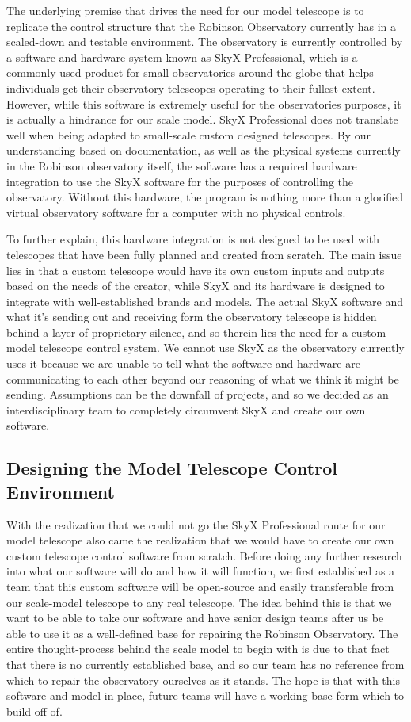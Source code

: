 \documentclass[12pt]{article}
\begin{document}
The underlying premise that drives the need for our model telescope is to replicate the control structure that the Robinson Observatory currently has in a scaled-down and testable environment. The observatory is currently controlled by a software and hardware system known as SkyX Professional, which is a commonly used product for small observatories around the globe that helps individuals get their observatory telescopes operating to their fullest extent. However, while this software is extremely useful for the observatories purposes, it is actually a hindrance for our scale model. SkyX Professional does not translate well when being adapted to small-scale custom designed telescopes. By our understanding based on documentation, as well as the physical systems currently in the Robinson observatory itself, the software has a required hardware integration to use the SkyX software for the purposes of controlling the observatory. Without this hardware, the program is nothing more than a glorified virtual observatory software for a computer with no physical controls.

To further explain, this hardware integration is not designed to be used with telescopes that have been fully planned and created from scratch. The main issue lies in that a custom telescope would have its own custom inputs and outputs based on the needs of the creator, while SkyX and its hardware is designed to integrate with well-established brands and models. The actual SkyX software and what it’s sending out and receiving form the observatory telescope is hidden behind a layer of proprietary silence, and so therein lies the need for a custom model telescope control system. We cannot use SkyX as the observatory currently uses it because we are unable to tell what the software and hardware are communicating to each other beyond our reasoning of what we think it might be sending. Assumptions can be the downfall of projects, and so we decided as an interdisciplinary team to completely circumvent SkyX and create our own software.

\subsection{Designing the Model Telescope Control Environment}

With the realization that we could not go the SkyX Professional route for our model telescope also came the realization that we would have to create our own custom telescope control software from scratch. Before doing any further research into what our software will do and how it will function, we first established as a team that this custom software will be open-source and easily transferable from our scale-model telescope to any real telescope. The idea behind this is that we want to be able to take our software and have senior design teams after us be able to use it as a well-defined base for repairing the Robinson Observatory. The entire thought-process behind the scale model to begin with is due to that fact that there is no currently established base, and so our team has no reference from which to repair the observatory ourselves as it stands. The hope is that with this software and model in place, future teams will have a working base form which to build off of.
\end{document}

